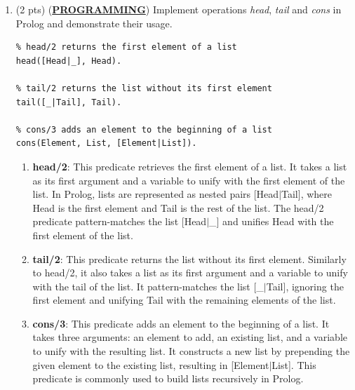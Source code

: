 \documentclass[12pt]{article}
\begin{document}
\begin{spacing}{1.5}
\begin{enumerate}
\begin{lstlisting}
; Test enqueue and dequeue operations
(enqueue 1) ; Enqueue element 1
(enqueue 2) ; Enqueue element 2
(enqueue 3) ; Enqueue element 3

(format t "Dequeued element: ~a~%" (dequeue)) ; Dequeue and print 1
(format t "Dequeued element: ~a~%" (dequeue)) ; Dequeue and print 2
(enqueue 4) ; Enqueue element 4
(format t "Dequeued element: ~a~%" (dequeue)) ; Dequeue and print 3
		      \end{lstlisting}
		      		      		      		              
		\item (2 pts) (\textbf{\uline{PROGRAMMING}}) Implement operations \textit{head}, \textit{tail} and \textit{cons} in Prolog and demonstrate their usage.
		      		      		      		      
		      \begin{lstlisting}
% head/2 returns the first element of a list
head([Head|_], Head).

% tail/2 returns the list without its first element
tail([_|Tail], Tail).

% cons/3 adds an element to the beginning of a list
cons(Element, List, [Element|List]).
		      \end{lstlisting}
		      		      		      
		      \begin{enumerate}
		      	\item \textbf{head/2}: This predicate retrieves the first element of a list. It takes a list as its first argument and a variable to unify with the first element of the list. In Prolog, lists are represented as nested pairs [Head$|$Tail], where Head is the first element and Tail is the rest of the list. The head/2 predicate pattern-matches the list [Head$|$\_] and unifies Head with the first element of the list.
		      	      		      	      		      	      
		      	\item \textbf{tail/2}: This predicate returns the list without its first element. Similarly to head/2, it also takes a list as its first argument and a variable to unify with the tail of the list. It pattern-matches the list [\_$|$Tail], ignoring the first element and unifying Tail with the remaining elements of the list.
		      	      		      	      		      	      
		      	\item \textbf{cons/3}: This predicate adds an element to the beginning of a list. It takes three arguments: an element to add, an existing list, and a variable to unify with the resulting list. It constructs a new list by prepending the given element to the existing list, resulting in [Element$|$List]. This predicate is commonly used to build lists recursively in Prolog.
		      \end{enumerate}
		      		      		      

\end{enumerate}
\end{spacing}
\end{document}

